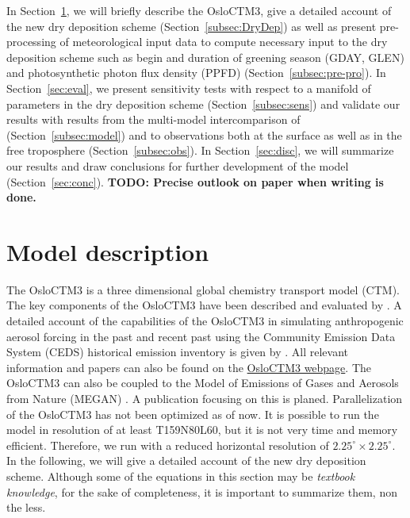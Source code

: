 \documentclass[gmd, manuscript]{copernicus}
\begin{document}
In Section~\ref{sec:model_des}, we will briefly describe the OsloCTM3, give a detailed account of the new dry deposition scheme (Section~\ref{subsec:DryDep}) as well as present pre-processing of meteorological input data to compute necessary input to the dry deposition scheme such as begin and duration of greening season (GDAY, GLEN) and photosynthetic photon flux density (PPFD) (Section~\ref{subsec:pre-pro}). In Section~\ref{sec:eval}, we present sensitivity tests with respect to a manifold of parameters in the dry deposition scheme (Section~\ref{subsec:sens}) and validate our results with results from the multi-model intercomparison of \citet{ACP:Hardacre2015} (Section~\ref{subsec:model}) and to observations both at the surface as well as in the free troposphere (Section~\ref{subsec:obs}). In Section~\ref{sec:disc}, we will summarize our results and draw conclusions for further development of the model (Section~\ref{sec:conc}).
{\bf TODO: Precise outlook on paper when writing is done.}
\section{Model description}
\label{sec:model_des}
The OsloCTM3 is a three dimensional global chemistry transport model (CTM). The key components of the OsloCTM3 have been described and evaluated by \citet{GMD:Sovde2012}. A detailed account of the capabilities of the OsloCTM3 in simulating anthropogenic aerosol forcing in the past and recent past using the Community Emission Data System (CEDS) historical emission inventory \citep{GMD:Hoesly2018} is given by \citet{GMD:Lund2018}. All relevant information and papers can also be found on the \href{http://folk.uio.no/mariantl/osloctm3/}{OsloCTM3 webpage}. The OsloCTM3 can also be coupled to the Model of Emissions of Gases and Aerosols from Nature (MEGAN) \citep{ACP:Guenther2006}. A publication focusing on this is planed. Parallelization of the OsloCTM3 has not been optimized as of now. It is possible to run the model in resolution of at least T159N80L60, but it is not very time and memory efficient. Therefore, we run with a reduced horizontal resolution of $2.25^\circ\times2.25^\circ$. In the following, we will give a detailed account of the new dry deposition scheme. Although some of the equations in this section may be \emph{textbook knowledge}, for the sake of completeness, it is important to summarize them, non the less.
\end{document}
